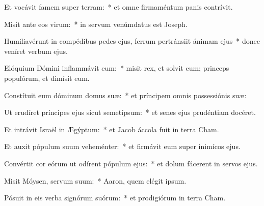 
\item Et vocávit famem super terram:~* et omne firmaméntum panis contrívit.

\item Misit ante eos virum:~* in servum venúmdatus est Joseph.

\item Humiliavérunt in compédibus pedes ejus, ferrum pertránsiit ánimam ejus~* donec veníret verbum ejus.

\item Elóquium Dómini inflammávit eum:~* misit rex, et solvit eum; princeps populórum, et dimísit eum.

\item Constítuit eum dóminum domus suæ:~* et príncipem omnis possessiónis suæ:

\item Ut erudíret príncipes ejus sicut semetípsum:~* et senes ejus prudéntiam docéret.

\item Et intrávit Israël in Ægýptum:~* et Jacob áccola fuit in terra Cham.

\item Et auxit pópulum suum veheménter:~* et firmávit eum super inimícos ejus.

\item Convértit cor eórum ut odírent pópulum ejus:~* et dolum fácerent in servos ejus.

\item Misit Móysen, servum suum:~* Aaron, quem elégit ipsum.

\item Pósuit in eis verba signórum suórum:~* et prodigiórum in terra Cham.
